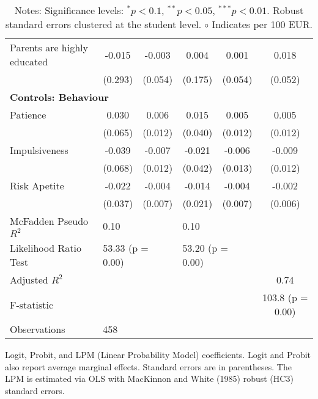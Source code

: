 \begin{table}
\begin{tabular}{lccccc}
Parents are highly educated & -0.015 & -0.003 & 0.004 & 0.001 & 0.018 \\
 & (0.293) & (0.054) & (0.175) & (0.054) & (0.052) \\
\midrule
\multicolumn{6}{l}{\textbf{Controls: Behaviour}} \\
Patience & 0.030 & 0.006 & 0.015 & 0.005 & 0.005 \\
 & (0.065) & (0.012) & (0.040) & (0.012) & (0.012) \\
Impulsiveness & -0.039 & -0.007 & -0.021 & -0.006 & -0.009 \\
 & (0.068) & (0.012) & (0.042) & (0.013) & (0.012) \\
Risk Apetite & -0.022 & -0.004 & -0.014 & -0.004 & -0.002 \\
 & (0.037) & (0.007) & (0.021) & (0.007) & (0.006) \\
\midrule
McFadden Pseudo $R^2$ & \multicolumn{2}{l}{0.10} & \multicolumn{2}{l}{0.10} & \\
Likelihood Ratio Test & \multicolumn{2}{l}{53.33 (p = 0.00)} & \multicolumn{2}{l}{53.20 (p = 0.00)} & \\
Adjusted $R^2$ & & & & & 0.74 \\
F-statistic & & & & & 103.8 (p = 0.00) \\
Observations & \multicolumn{5}{l}{458} \\
\bottomrule
\end{tabular}
\caption*{Logit, Probit, and LPM (Linear Probability Model) coefficients. Logit and Probit also report average marginal effects. Standard errors are in parentheses. The LPM is estimated via OLS with MacKinnon and White (1985) robust (HC3) standard errors.}
\label{tab:logit_probit_lpm_results}
\caption*{\small{Notes: Significance levels: $^{{*}} p < 0.1$, $^{{**}} p < 0.05$, $^{{***}} p < 0.01$. Robust standard errors clustered at the student level. $\circ$ Indicates per 100 EUR.}}
\end{table}
